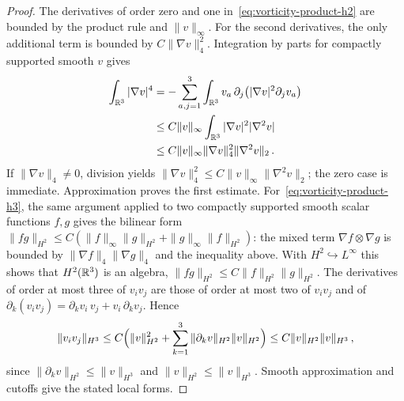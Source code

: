 \documentclass[11pt,letterpaper]{article}
\numberwithin{equation}{section}
\theoremstyle{plain}
\theoremstyle{definition}
\theoremstyle{remark}
\begin{document}
\begin{proof}
The derivatives of order zero and one in~\eqref{eq:vorticity-product-h2} are bounded by the product rule and $\|v\|_\infty$. For the second derivatives, the only additional term is bounded by $C\|\nabla v\|_4^2$. Integration by parts for compactly supported smooth $v$ gives
\[
\begin{aligned}
 \int_{\mathbb{R}^3}|\nabla v|^4
 &=-\sum_{a,j=1}^3\int_{\mathbb{R}^3}v_a\,\partial_j\big(|\nabla v|^2\partial_jv_a\big)\\
 &\le C\|v\|_\infty\int_{\mathbb{R}^3}|\nabla v|^2|\nabla^2v|\\
 &\le C\|v\|_\infty\|\nabla v\|_4^2\|\nabla^2v\|_2\,.
\end{aligned}
\]
If $\|\nabla v\|_4\ne0$, division yields
$\|\nabla v\|_4^2\le C\|v\|_\infty\|\nabla^2v\|_2$; the zero case is immediate. Approximation proves the first estimate. For~\eqref{eq:vorticity-product-h3}, the same argument applied to two compactly supported smooth scalar functions $f,g$ gives the bilinear form $\|fg\|_{H^2}\le C(\|f\|_\infty\|g\|_{H^2}+\|g\|_\infty\|f\|_{H^2})$: the mixed term $\nabla f\otimes\nabla g$ is bounded by $\|\nabla f\|_4\|\nabla g\|_4$ and the inequality above. With $H^2\hookrightarrow L^\infty$ this shows that $H^2(\mathbb{R}^3)$ is an algebra, $\|fg\|_{H^2}\le C\|f\|_{H^2}\|g\|_{H^2}$. The derivatives of order at most three of $v_iv_j$ are those of order at most two of $v_iv_j$ and of $\partial_k(v_iv_j)=\partial_kv_i\,v_j+v_i\,\partial_kv_j$. Hence
\[
 \|v_iv_j\|_{H^3}
 \le C\Bigl(\|v\|_{H^2}^2+\sum_{k=1}^3\|\partial_kv\|_{H^2}\|v\|_{H^2}\Bigr)
 \le C\|v\|_{H^2}\|v\|_{H^3}\,,
\]
since $\|\partial_kv\|_{H^2}\le\|v\|_{H^3}$ and $\|v\|_{H^2}\le\|v\|_{H^3}$. Smooth approximation and cutoffs give the stated local forms.


\end{proof}
\end{document}
